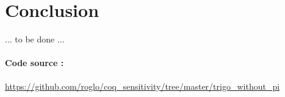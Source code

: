 \documentclass[11pt]{article}
\begin{document}
\section{Conclusion}

... to be done ...

\paragraph{Code source :}
\url{https://github.com/roglo/coq_sensitivity/tree/master/trigo_without_pi}
\end{document}
